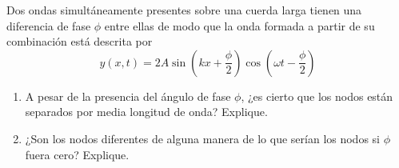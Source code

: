 \item Dos ondas simultáneamente presentes sobre una cuerda larga tienen una diferencia de fase $\phi$ entre ellas de modo que la onda formada a partir de su combinación está descrita por
$$ y(x, t) = 2A \sin\left(kx + \frac{\phi}{2}\right) \cos\left(\omega t - \frac{\phi}{2}\right) $$
\begin{enumerate}
    \item A pesar de la presencia del ángulo de fase $\phi$, ¿es cierto que los nodos están separados por media longitud de onda? Explique.
    \item ¿Son los nodos diferentes de alguna manera de lo que serían los nodos si $\phi$ fuera cero? Explique.
\end{enumerate}